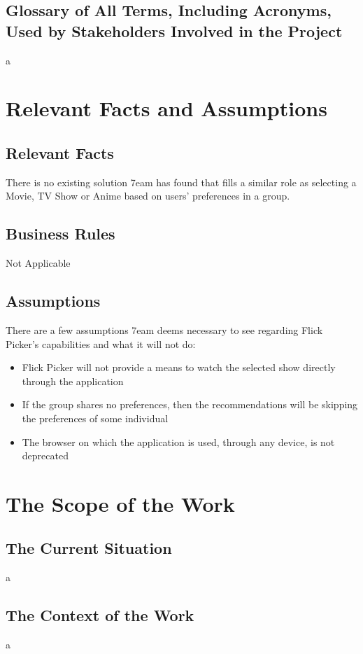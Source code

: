 \documentclass[12pt]{article}
\begin{document}
\subsection{Glossary of All Terms, Including Acronyms, Used by Stakeholders Involved in the Project}
a

\section{Relevant Facts and Assumptions}

\subsection{Relevant Facts}
There is no existing solution 7eam has found that fills a similar role as selecting a Movie, TV Show or Anime based on users' preferences in a group.


\subsection{Business Rules}
Not Applicable

\subsection{Assumptions}
There are a few assumptions 7eam deems necessary to see regarding Flick Picker's capabilities and what it will not do:
\begin{itemize}
	\item Flick Picker will not provide a means to watch the selected show directly through the application
	\item If the group shares no preferences, then the recommendations will be skipping the preferences of some individual
	\item The browser on which the application is used, through any device, is not deprecated
\end{itemize}


\section{The Scope of the Work}

\subsection{The Current Situation}
a

\subsection{The Context of the Work}
a
\end{document}
